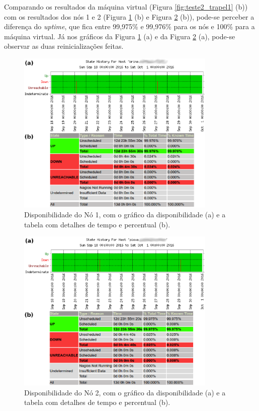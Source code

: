 Comparando os resultados da máquina virtual (Figura \ref{fig:teste2_trapel1} (b)) com os resultados dos nós 1 e 2 (Figura \ref{fig:teste2_brina1} 
(b) e Figura \ref{fig:teste2_piova1} (b)), pode-se perceber a diferença do \textit{uptime}, que fica entre 99,975\% e 99,976\% para os nós e 
100\% para a máquina virtual. Já nos gráficos da Figura \ref{fig:teste2_brina1} (a) e da Figura \ref{fig:teste2_piova1} (a), pode-se observar 
as duas reinicializações feitas.
\begin{figure}[h!]
 \centering
 \includegraphics[width=360px]{img/teste2_brina1.eps}
 \caption{Disponibilidade do Nó 1, com o gráfico da disponibilidade (a) e a tabela com detalhes de tempo e percentual (b).}
 \label{fig:teste2_brina1}
\end{figure}

\begin{figure}[h!]
 \centering
 \includegraphics[width=360px]{img/teste2_piova1.eps}
 \caption{Disponibilidade do Nó 2, com o gráfico da disponibilidade (a) e a tabela com detalhes de tempo e percentual (b).}
 \label{fig:teste2_piova1}
\end{figure}

